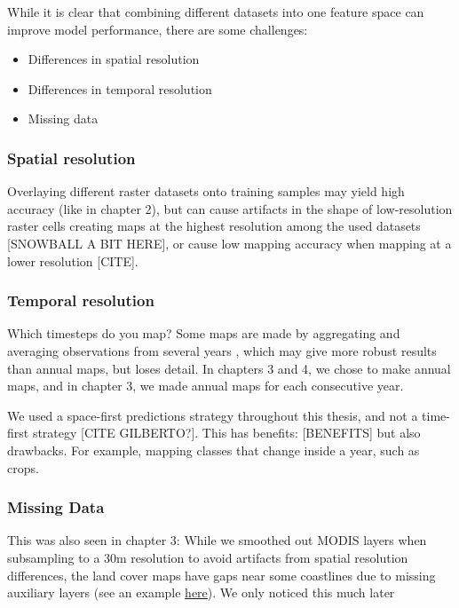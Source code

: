         While it is clear that combining different datasets into one feature space can improve model performance, there are some challenges:
        \begin{itemize}
        \item Differences in spatial resolution
        \item Differences in temporal resolution
        \item Missing data
        \end{itemize}
    
    \subsubsection{Spatial resolution}
    
        Overlaying different raster datasets onto training samples may yield high accuracy (like in chapter 2), but can cause artifacts in the shape of low-resolution raster cells creating maps at the highest resolution among the used datasets \citep{moller2019oblique} [SNOWBALL A BIT HERE], or cause low mapping accuracy when mapping at a lower resolution [CITE]. 
        
    \subsubsection{Temporal resolution}
    
        Which timesteps do you map? Some maps are made by aggregating and averaging observations from several years \citep{pflugmacher2019mapping,esa2023cci}, which may give more robust results than annual maps, but loses detail. In chapters 3 and 4, we chose to make annual maps, and in chapter 3, we made annual maps for each consecutive year. 
    
        We used a space-first predictions strategy throughout this thesis, and not a time-first strategy [CITE GILBERTO?]. This has benefits: [BENEFITS] but also drawbacks. For example, mapping classes that change inside a year, such as crops.
        
    \subsubsection{Missing Data}
        
        This was also seen in chapter 3: While we smoothed out MODIS layers when subsampling to a 30m resolution to avoid artifacts from spatial resolution differences, the land cover maps have gaps near some coastlines due to missing auxiliary layers (see an example \href{https://ecodatacube.eu/?base=OpenStreetMap%20(grayscale)&layer=Land%20Cover%20&zoom=13.2&eye=5000000&center=52.4582,5.3267&opacity=100&time=2019}{here}). We only noticed this much later
    
